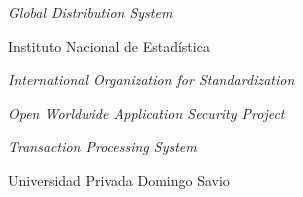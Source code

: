 \begin{description}[style=nextline,leftmargin=1.27cm,labelindent=0pt,%
  labelsep=0.4em,font=\bfseries,itemsep=0.15\baselineskip]
  \item[GDS] \emph{Global Distribution System}
  \item[INE] Instituto Nacional de Estadística
  \item[ISO] \emph{International Organization for Standardization}
  \item[OWASP] \emph{Open Worldwide Application Security Project}
  \item[TPS] \emph{Transaction Processing System}
  \item[UPDS] Universidad Privada Domingo Savio
\end{description}
